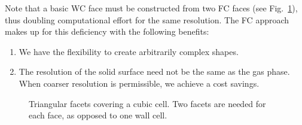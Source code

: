 \documentclass[12pt]{article}
\begin{document}
Note that a basic WC face must be constructed from two FC faces (see Fig.~\ref{fig:facetcell}), thus doubling computational effort for the same resolution.  The FC approach makes up for this deficiency with the following benefits:
\begin{enumerate}[{(}i{)}]
\item We have the flexibility to create arbitrarily complex shapes.
\item The resolution of the solid surface need not be the same as the gas phase.  When coarser resolution is permissible, we achieve a cost savings.
\end{enumerate}


\begin{figure}
\begin{center}

\caption{Triangular facets covering a cubic cell.  Two facets are needed for each face, as opposed to one wall cell.}
\label{fig:facetcell}
\end{center}
\end{figure}
\end{document}
